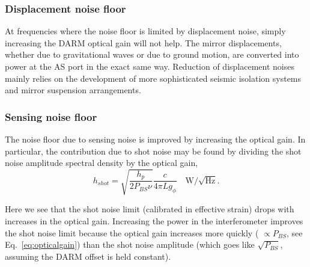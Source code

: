 \subsubsection{Displacement noise floor} 
At frequencies where the noise floor is limited by displacement noise,
simply increasing the DARM optical gain will not help. The mirror
displacements, whether due to gravitational waves or due to ground
motion, are converted into power at the AS port in the exact same
way.   Reduction of displacement noises mainly relies on the development
of more sophisticated seismic isolation systems and mirror suspension
arrangements.


\subsubsection{Sensing noise floor}
The noise floor due to sensing noise is improved by increasing the
optical gain. 
In particular, the contribution due to shot noise  may be found by 
dividing the shot noise amplitude spectral density by the optical gain,
\begin{equation}
h_{shot} = \sqrt{\frac{h_p}{2 P_{BS} \nu}} \frac{c}{4 \pi L g_{\phi}}
\quad \text{W}/\sqrt{\text{Hz}}.
\label{eq:SNL}
\end{equation}

Here we see that the shot noise limit (calibrated in effective strain)
drops with increases in the optical gain. 
Increasing the power in the interferometer improves the shot noise limit
because the optical gain increases more quickly ( $\propto
P_{BS}$, see Eq.~\ref{eq:opticalgain}) than the shot noise amplitude
(which goes like $\sqrt{P_{BS}}$, assuming the DARM offset is held
constant).




